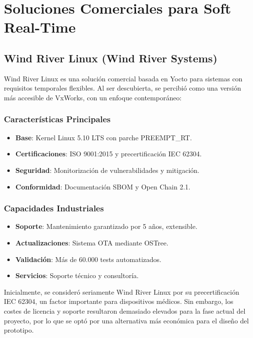 \newpage
\section{Soluciones Comerciales para Soft Real-Time}
    \subsection{Wind River Linux (Wind River Systems)}
        Wind River Linux es una solución comercial basada en Yocto para sistemas con requisitos temporales flexibles. Al ser descubierta, se percibió como una versión más accesible de VxWorks, con un enfoque contemporáneo:

        \subsubsection{Características Principales}
            \begin{itemize}
                \item \textbf{Base}: Kernel Linux 5.10 LTS con parche PREEMPT\_RT.
                \item \textbf{Certificaciones}: ISO 9001:2015 y precertificación IEC 62304.
                \item \textbf{Seguridad}: Monitorización de vulnerabilidades y mitigación.
                \item \textbf{Conformidad}: Documentación SBOM y Open Chain 2.1.
            \end{itemize}

        \subsubsection{Capacidades Industriales}
            \begin{itemize}
                \item \textbf{Soporte}: Mantenimiento garantizado por 5 años, extensible.
                \item \textbf{Actualizaciones}: Sistema OTA mediante OSTree.
                \item \textbf{Validación}: Más de 60.000 tests automatizados.
                \item \textbf{Servicios}: Soporte técnico y consultoría.
            \end{itemize}

        Inicialmente, se consideró seriamente Wind River Linux por su precertificación IEC 62304, un factor importante para dispositivos médicos. Sin embargo, los costes de licencia y soporte resultaron demasiado elevados para la fase actual del proyecto, por lo que se optó por una alternativa más económica para el diseño del prototipo.

